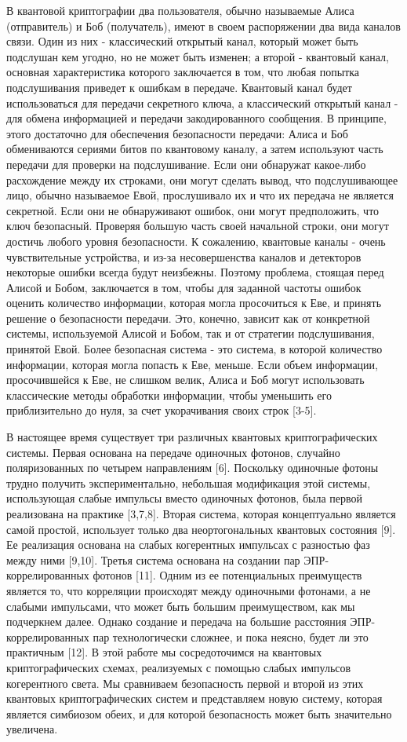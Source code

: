 В квантовой криптографии два пользователя, обычно называемые Алиса (отправитель) и Боб (получатель), имеют в своем распоряжении два вида каналов связи. Один из них - классический открытый канал, который может быть подслушан кем угодно, но не может быть изменен; а второй - квантовый канал, основная характеристика которого заключается в том, что любая попытка подслушивания приведет к ошибкам в передаче. Квантовый канал будет использоваться для передачи секретного ключа, а классический открытый канал - для обмена информацией и передачи закодированного сообщения. В принципе, этого достаточно для обеспечения безопасности передачи: Алиса и Боб обмениваются сериями битов по квантовому каналу, а затем используют часть передачи для проверки на подслушивание. Если они обнаружат какое-либо расхождение между их строками, они могут сделать вывод, что подслушивающее лицо, обычно называемое Евой, прослушивало их и что их передача не является секретной. Если они не обнаруживают ошибок, они могут предположить, что ключ безопасный. Проверяя большую часть своей начальной строки, они могут достичь любого уровня безопасности. К сожалению, квантовые каналы - очень чувствительные устройства, и из-за несовершенства каналов и детекторов некоторые ошибки всегда будут неизбежны. Поэтому проблема, стоящая перед Алисой и Бобом, заключается в том, чтобы для заданной частоты ошибок оценить количество информации, которая могла просочиться к Еве, и принять решение о безопасности передачи. Это, конечно, зависит как от конкретной системы, используемой Алисой и Бобом, так и от стратегии подслушивания, принятой Евой. Более безопасная система - это система, в которой количество информации, которая могла попасть к Еве, меньше. Если объем информации, просочившейся к Еве, не слишком велик, Алиса и Боб могут использовать классические методы обработки информации, чтобы уменьшить его приблизительно до нуля, за счет укорачивания своих строк [3-5].

В настоящее время существует три различных квантовых криптографических системы. Первая основана на передаче одиночных фотонов, случайно поляризованных по четырем направлениям [6].
Поскольку одиночные фотоны трудно получить экспериментально, небольшая модификация этой системы, использующая слабые импульсы вместо одиночных фотонов, была первой реализована на практике [3,7,8]. Вторая система, которая концептуально является самой простой, использует только два неортогональных квантовых состояния [9]. Ее реализация основана на слабых когерентных импульсах с разностью фаз между ними [9,10]. Третья система основана на создании пар ЭПР-коррелированных фотонов [11]. Одним из ее потенциальных преимуществ является то, что корреляции происходят между одиночными фотонами, а не слабыми импульсами, что может быть большим преимуществом, как мы подчеркнем далее. Однако создание и передача на большие расстояния ЭПР-коррелированных пар технологически сложнее, и пока неясно, будет ли это практичным [12]. В этой работе мы сосредоточимся на квантовых криптографических схемах, реализуемых с помощью слабых импульсов когерентного света. Мы сравниваем безопасность первой и второй из этих квантовых криптографических систем и представляем новую систему, которая является симбиозом обеих, и для которой безопасность может быть значительно увеличена.

